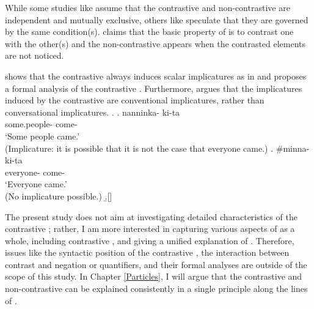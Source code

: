 While some studies like  assume that
the contrastive  and non-contrastive  are independent and mutually exclusive,
others like  speculate that
they are governed by the same condition(s).
claims that the basic property of  is to contrast one with the other(s) and
the non-contrastive  appears when the contrasted elements are not noticed.



shows that the contrastive  always induces scalar implicatures as in \Next[a] and
proposes a formal analysis of the contrastive .
Furthermore,
 argues that the implicatures induced by the contrastive 
are conventional implicatures, rather than conversational implicatures.
%
\ex.
 \ag. nanninka- ki-ta \\
      some.people- come- \\
      `Some people came.'\\
      (Implicature: it is possible that it is not the case that
      everyone came.)
  \bg. \#minna- ki-ta \\
        everyone- come- \\
        `Everyone came.'\\
        (No implicature possible.)
  \b.[] \hfill{\cite[36]{hara06}}


The present study does not aim at investigating detailed characteristics of
the contrastive ;
rather, I am more interested in capturing various aspects of  as a whole,
including contrastive ,
and giving a unified explanation of .
Therefore, issues like the syntactic position of the contrastive ,
the interaction between contrast and negation or quantifiers,
and their formal analyses
are outside of the scope of this study.
In Chapter \ref{Particles},
I will argue that the contrastive and non-contrastive  can be explained consistently in a single principle
along the lines of .

